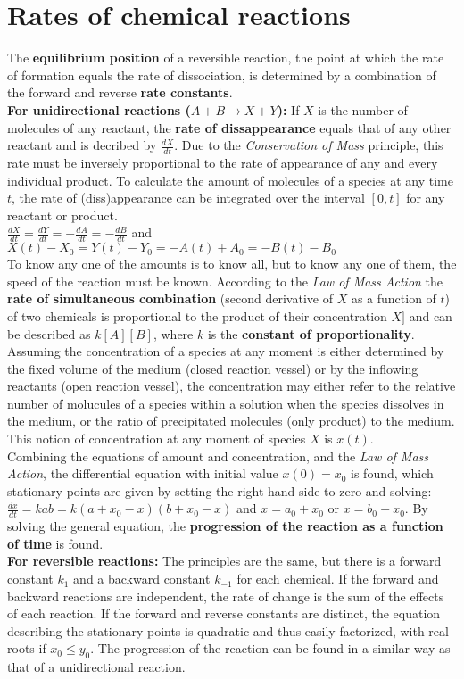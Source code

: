 \documentclass{article}
\begin{document}
	\section{Rates of chemical reactions}
		The \textbf{equilibrium position} of a reversible reaction, the point at which the rate of formation equals the rate of dissociation, is determined by a combination of the forward and reverse \textbf{rate constants}.\\
		\textbf{For unidirectional reactions ($A + B \rightarrow X + Y$):} If $X$ is the number of molecules of any reactant, the \textbf{rate of dissappearance} equals that of any other reactant and is decribed by $\frac{dX}{dt}$. Due to the \emph{Conservation of Mass} principle, this rate must be inversely proportional to the rate of appearance of any and every individual product. To calculate the amount of molecules of a species at any time $t$, the rate of (diss)appearance can be integrated over the interval $[0,t]$ for any reactant or product.\\
		$\frac{dX}{dt} = \frac{dY}{dt} = -\frac{dA}{dt} = -\frac{dB}{dt}$ and $X(t) - X_0 = Y(t) - Y_0 = -A(t) + A_0 = -B(t) - B_0$\\
		To know any one of the amounts is to know all, but to know any one of them, the speed of the reaction must be known. According to the \emph{Law of Mass Action} the \textbf{rate of simultaneous combination} (second derivative of $X$ as a function of $t$) of two chemicals is proportional to the product of their concentration $X]$ and can be described as $k[A][B]$, where $k$ is the \textbf{constant of proportionality}.\\
		Assuming the concentration of a species at any moment is either determined by the fixed volume of the medium (closed reaction vessel) or by the inflowing reactants (open reaction vessel), the concentration may either refer to the relative number of molucules of a species within a solution when the species dissolves in the medium, or the ratio of precipitated molecules (only product) to the medium. This notion of concentration at any moment of species $X$ is $x(t)$.\\
		Combining the equations of amount and concentration, and the \emph{Law of Mass Action}, the differential equation with initial value $x(0) = x_0$ is found, which stationary points are given by setting the right-hand side to zero and solving: $\frac{dx}{dt} = kab = k(a + x_0 - x)(b + x_0 - x)$ and $x = a_0 + x_0$ or $x = b_0 + x_0$. By solving the general equation, the \textbf{progression of the reaction as a function of time} is found.\\
		\textbf{For reversible reactions:} The principles are the same, but there is a forward constant $k_1$ and a backward constant $k_{-1}$ for each chemical. If the forward and backward reactions are independent, the rate of change is the sum of the effects of each reaction. If the forward and reverse constants are distinct, the equation describing the stationary points is quadratic and thus easily factorized, with real roots if $x_0 \leq y_0$. The progression of the reaction can be found in a similar way as that of a unidirectional reaction.
\end{document}
